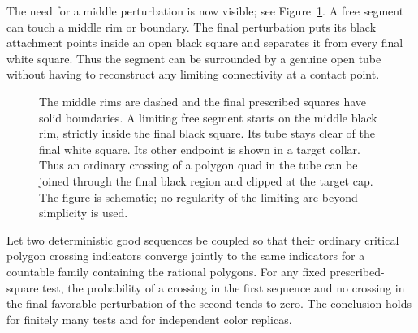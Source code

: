 The need for a middle perturbation is now visible; see
Figure~\ref{fig:forced-tube}. A free segment can touch a
middle rim or boundary. The final perturbation puts its black attachment
points inside an open black square and separates it from every final white
square. Thus the segment can be surrounded by a genuine open tube without
having to reconstruct any limiting connectivity at a contact point.

\begin{figure}[t]
\centering
{}
\caption{The middle rims are dashed and the final prescribed squares have
solid boundaries. A limiting free segment starts on the middle black rim,
strictly inside the final black square. Its tube stays clear of the final
white square. Its other endpoint is shown in a target collar. Thus an
ordinary crossing of a polygon quad in the tube can be joined through the
final black region and clipped at the target cap. The figure is schematic;
no regularity of the limiting arc beyond simplicity is used.}
\label{fig:forced-tube}
\end{figure}

\begin{lemma}\label{lem:forced-transfer}
Let two deterministic good sequences be coupled so that their ordinary
critical polygon crossing indicators converge jointly to the same indicators
for a countable family containing the rational polygons. For any fixed
prescribed-square test, the probability of a crossing in the first sequence
and no crossing in the final favorable perturbation of the second tends to
zero. The conclusion holds for finitely many tests and for independent
color replicas.
\end{lemma}


